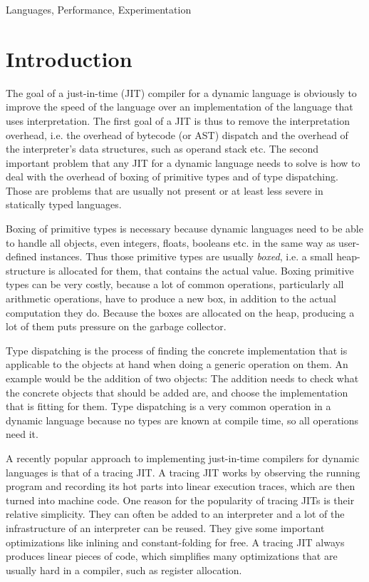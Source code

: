 \documentclass{sigplanconf}
\begin{document}
\terms
Languages, Performance, Experimentation


\section{Introduction}

The goal of a just-in-time (JIT) compiler for a dynamic language is obviously to
improve the speed of the language over an implementation of the language that
uses interpretation. The first goal of a JIT is thus to remove the
interpretation overhead, i.e. the overhead of bytecode (or AST) dispatch and the
overhead of the interpreter's data structures, such as operand stack etc. The
second important problem that any JIT for a dynamic language needs to solve is
how to deal with the overhead of boxing of primitive types and of type
dispatching. Those are problems that are usually not present or at least less
severe in statically typed languages.

Boxing of primitive types is necessary because dynamic languages need to be able to handle
all objects, even integers, floats, booleans etc. in the same way as user-defined
instances. Thus those primitive types are usually \emph{boxed}, i.e. a small
heap-structure is allocated for them, that contains the actual value. Boxing
primitive types can be very costly, because a lot of common operations,
particularly all arithmetic operations, have to produce a new box, in addition
to the actual computation they do. Because the boxes are allocated on the heap,
producing a lot of them puts pressure on the garbage collector.

Type dispatching is the process of finding the concrete implementation that is
applicable to the objects at hand when doing a generic operation on them. An
example would be the addition of two objects: The addition needs to check what
the concrete objects that should be added are, and choose the implementation
that is fitting for them. Type dispatching is a very common operation in a
dynamic language because no types are known at compile time, so all operations
need it.

A recently popular approach to implementing just-in-time compilers for dynamic
languages is that of a tracing JIT. A tracing JIT works by observing the running
program and recording its hot parts into linear execution traces, which are then turned into
machine code. One reason for the popularity of tracing JITs is their relative
simplicity. They can often be added to an interpreter and a lot of the
infrastructure of an interpreter can be reused. They give some important
optimizations like inlining and constant-folding for free. A tracing JIT always
produces linear pieces of code, which simplifies many optimizations that are usually
hard in a compiler, such as register allocation.
\end{document}

